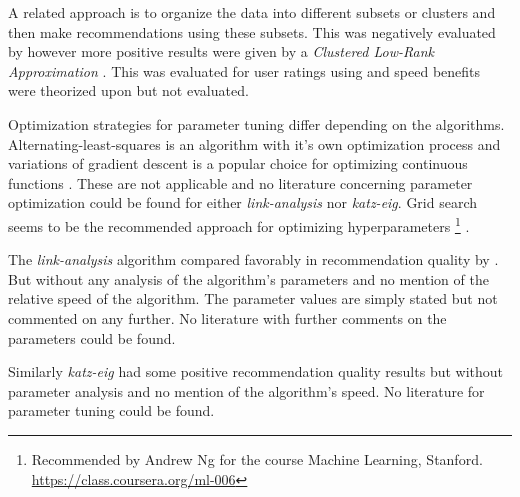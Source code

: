 A related approach is to organize the data into different subsets or clusters and then make recommendations using these subsets. This was negatively evaluated by \citep{cacheda2011comparison} however more positive results were given by a \textit{Clustered Low-Rank Approximation} \citep{niklas, savas2011clustered}.  This was evaluated for user ratings using \rmse and speed benefits were theorized upon but not evaluated.

Optimization strategies for parameter tuning differ depending on the algorithms. Alternating-least-squares is an algorithm with it's own optimization process and variations of gradient descent is a popular choice for optimizing continuous functions \citep{hu2008collaborative}. These are not applicable and no literature concerning parameter optimization could be found for either \textit{link-analysis} nor \textit{katz-eig}.  Grid search seems to be the recommended approach for optimizing hyperparameters
\footnote{Recommended by Andrew Ng for the course Machine Learning, Stanford. \url{https://class.coursera.org/ml-006}}
.

The \textit{link-analysis} algorithm compared favorably in recommendation quality by \citep{huang2007comparison}. But without any analysis of the algorithm's parameters and no mention of the relative speed of the algorithm. The parameter values are simply stated but not commented on any further. No literature with further comments on the parameters could be found.

Similarly \textit{katz-eig} had some positive recommendation quality results \citep{shin2012multi} but without parameter analysis and no mention of the algorithm's speed. No literature for parameter tuning could be found.






